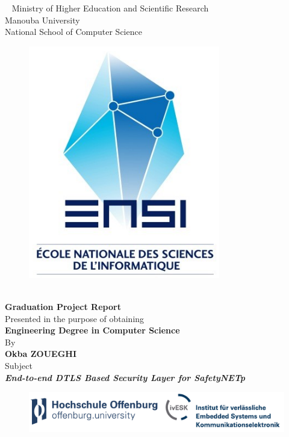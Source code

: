 \begin{center}
\hbox{ }
\large{Ministry of Higher Education and Scientific Research \\}
\large{Manouba University\\}
\large{National School of Computer Science\\}
\vspace{1mm}
\begin{figure}[H]
\centering
\includegraphics[scale=0.37]{figures/titlepage_fig/logoEnsi.png}
\end{figure}
\\ \textbf{\Large {Graduation Project Report\\}}
\large {Presented in the purpose of obtaining\\}
\textbf{\Large {Engineering Degree in Computer Science\\}}
\large {By\\}
\textbf{\Large {Okba ZOUEGHI\\}}
\vspace{2mm}
\large {Subject\\}
\textbf{\Large{\textit{End-to-end DTLS Based Security Layer for SafetyNETp\\}}}
\vspace{1mm}
\begin{figure}[H]
\centering
\includegraphics[scale=0.65]{figures/titlepage_fig/logoivesk.pdf}
\end{figure}
\end{center}
